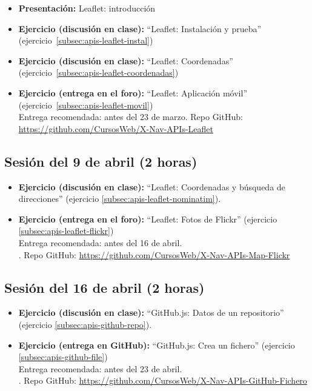 \documentclass[a4paper,12pt]{report}
\begin{document}
\begin{itemize}
\item \textbf{Presentación:} Leaflet: introducción
\item \textbf{Ejercicio (discusión en clase):} ``Leaflet: Instalación y prueba'' (ejercicio~\ref{subsec:apis-leaflet-instal})
\item \textbf{Ejercicio (discusión en clase):} ``Leaflet: Coordenadas'' (ejercicio~\ref{subsec:apis-leaflet-coordenadas})
\item \textbf{Ejercicio (entrega en el foro):} ``Leaflet: Aplicación móvil'' (ejercicio~\ref{subsec:apis-leaflet-movil}) \\
  Entrega recomendada: antes del 23 de marzo.
  Repo GitHub: \url{https://github.com/CursosWeb/X-Nav-APIs-Leaflet}
\end{itemize}

\subsection{Sesión del 9 de abril (2 horas)}

\begin{itemize}
\item \textbf{Ejercicio (discusión en clase):} ``Leaflet: Coordenadas y búsqueda de direcciones'' (ejercicio \ref{subsec:apis-leaflet-nominatim}).
\item \textbf{Ejercicio (entrega en el foro):} ``Leaflet: Fotos de Flickr'' (ejercicio \ref{subsec:apis-leaflet-flickr})  \\
  Entrega recomendada: antes del 16 de abril. \\.
  Repo GitHub: \url{https://github.com/CursosWeb/X-Nav-APIs-Map-Flickr}
\end{itemize}


\subsection{Sesión del 16 de abril (2 horas)}

\begin{itemize}
\item \textbf{Ejercicio (discusión en clase):} ``GitHub.js: Datos de un repositorio'' (ejercicio \ref{subsec:apis-github-repo}).
\item \textbf{Ejercicio (entrega en GitHub):} ``GitHub.js: Crea un fichero'' (ejercicio \ref{subsec:apis-github-file})  \\
  Entrega recomendada: antes del 23 de abril. \\.
  Repo GitHub: \url{https://github.com/CursosWeb/X-Nav-APIs-GitHub-Fichero}
\end{itemize}
\end{document}
